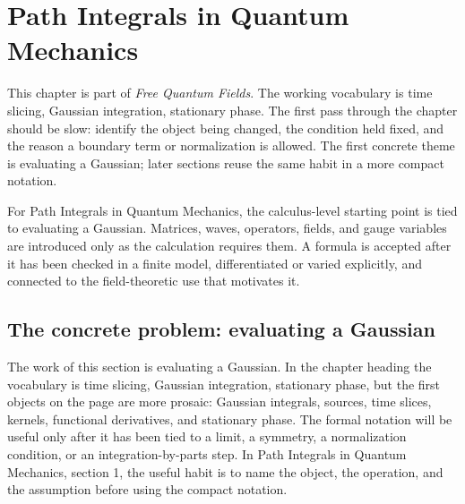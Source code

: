 \chapter{Path Integrals in Quantum Mechanics}


This chapter is part of \emph{Free Quantum Fields}.  The working vocabulary is time slicing, Gaussian integration, stationary phase.  The first pass through the chapter should be slow: identify the object being changed, the condition held fixed, and the reason a boundary term or normalization is allowed.  The first concrete theme is evaluating a Gaussian; later sections reuse the same habit in a more compact notation.

For Path Integrals in Quantum Mechanics, the calculus-level starting point is tied to evaluating a Gaussian.  Matrices, waves, operators, fields, and gauge variables are introduced only as the calculation requires them.  A formula is accepted after it has been checked in a finite model, differentiated or varied explicitly, and connected to the field-theoretic use that motivates it.

\section{The concrete problem: evaluating a Gaussian}













The work of this section is evaluating a Gaussian.  In the chapter heading the vocabulary is time slicing, Gaussian integration, stationary phase, but the first objects on the page are more prosaic: Gaussian integrals, sources, time slices, kernels, functional derivatives, and stationary phase.  The formal notation will be useful only after it has been tied to a limit, a symmetry, a normalization condition, or an integration-by-parts step.  In Path Integrals in Quantum Mechanics, section 1, the useful habit is to name the object, the operation, and the assumption before using the compact notation.

